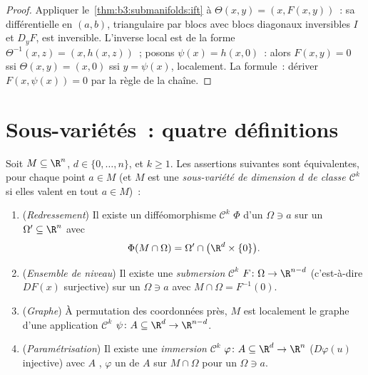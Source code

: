 \begin{proof}
Appliquer le~\cref{thm:b3:submanifolds:ift} à $\Theta(x, y) = (x,
F(x,y))$~: sa différentielle en $(a,b)$, triangulaire par blocs
avec blocs diagonaux inversibles $I$ et $D_yF$, est inversible.
L'inverse local est de la forme $\Theta^{-1}(x, z) = (x, h(x,
z))$~; posons $\psi(x) = h(x, 0)$~: alors $F(x, y) = 0$ ssi
$\Theta(x,y) = (x, 0)$ ssi $y = \psi(x)$, localement. La
formule~: dériver $F(x, \psi(x)) = 0$ par la règle de la
chaîne.
\end{proof}

\section{Sous-variétés~: quatre définitions}

\begin{theorem}
\label{thm:b3:submanifolds:characterizations}
Soit $M \subseteq \R^n$, $d \in \{0, \dots, n\}$, et $k \geq
1$. Les assertions suivantes sont équivalentes, pour chaque
point $a \in M$ (et $M$ est une \emph{sous-variété de dimension
$d$ de classe $\mathcal C^k$} si elles
valent en tout $a \in M$)~:
\begin{enumerate}
  \item (\emph{Redressement}) Il existe un difféomorphisme
        $\mathcal C^k$ $\Phi$ d'un  $\Omega \ni a$ sur
        un  $\Omega' \subseteq \R^n$ avec
        \[
        \Phi(M\cap\Omega) = \Omega' \cap
        \bigl(\R^d\times\{0\}\bigr).
        \]
  \item (\emph{Ensemble de niveau}) Il existe une
        \emph{submersion} $\mathcal C^k$ $F \colon \Omega \to
        \R^{n-d}$ (c'est-à-dire $DF(x)$ surjective) sur un
         $\Omega \ni a$ avec $M\cap\Omega = F^{-1}(0)$.
  \item (\emph{Graphe}) À permutation des coordonnées près,
        $M$ est localement le graphe d'une application
        $\mathcal C^k$ $\psi \colon A \subseteq \R^d \to
        \R^{n-d}$.
  \item (\emph{Paramétrisation}) Il existe une
        \emph{immersion} $\mathcal C^k$ $\varphi \colon A
        \subseteq \R^d \to \R^n$ ($D\varphi(u)$ injective)
        avec $A$ , $\varphi$ un  de $A$
        sur $M \cap \Omega$ pour un  $\Omega \ni a$.
\end{enumerate}
\end{theorem}


